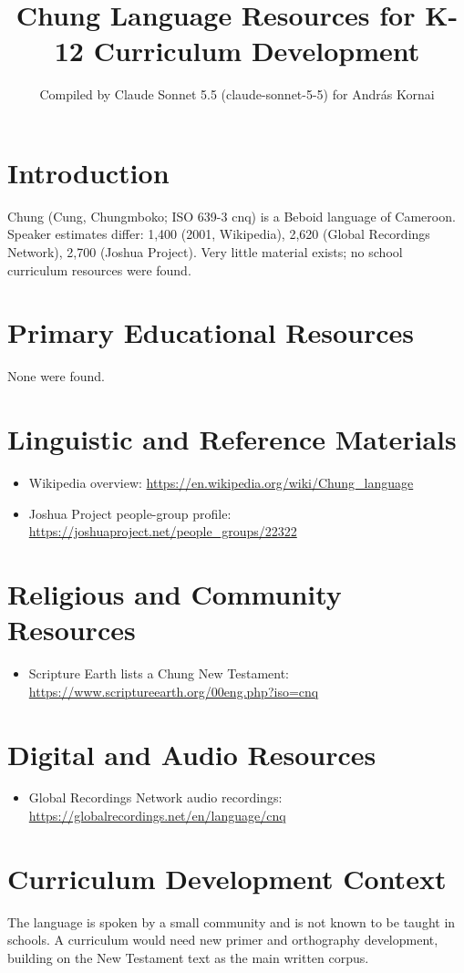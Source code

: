 \documentclass[12pt]{article}
\title{Chung Language Resources for K-12 Curriculum Development}
\author{Compiled by Claude Sonnet 5.5 (claude-sonnet-5-5) for Andr\'as Kornai}
\date{}
\begin{document}
\maketitle

\section{Introduction}
Chung (Cung, Chungmboko; ISO 639-3 cnq) is a Beboid language of Cameroon. Speaker estimates differ: 1,400 (2001, Wikipedia), 2,620 (Global Recordings Network), 2,700 (Joshua Project). Very little material exists; no school curriculum resources were found.

\section{Primary Educational Resources}
None were found.

\section{Linguistic and Reference Materials}
\begin{itemize}
\item Wikipedia overview: \url{https://en.wikipedia.org/wiki/Chung_language}
\item Joshua Project people-group profile: \url{https://joshuaproject.net/people_groups/22322}
\end{itemize}

\section{Religious and Community Resources}
\begin{itemize}
\item Scripture Earth lists a Chung New Testament: \url{https://www.scriptureearth.org/00eng.php?iso=cnq}
\end{itemize}

\section{Digital and Audio Resources}
\begin{itemize}
\item Global Recordings Network audio recordings: \url{https://globalrecordings.net/en/language/cnq}
\end{itemize}

\section{Curriculum Development Context}
The language is spoken by a small community and is not known to be taught in schools. A curriculum would need new primer and orthography development, building on the New Testament text as the main written corpus.
\end{document}
